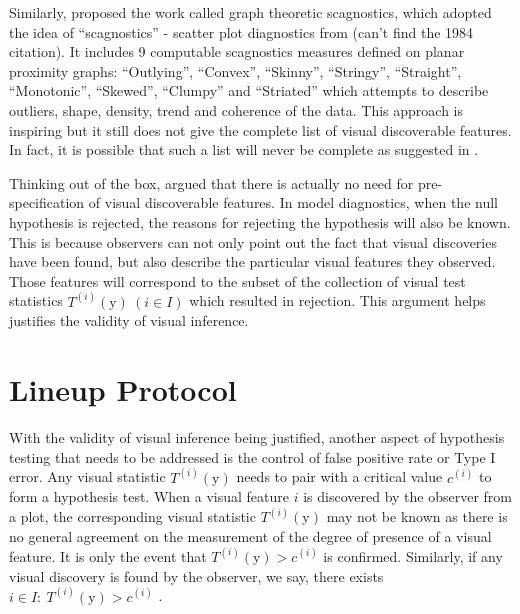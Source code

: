 \documentclass{monashthesis}
\theoremstyle{definition}
\theoremstyle{definition}
\theoremstyle{definition}
\theoremstyle{definition}
\theoremstyle{remark}
\begin{document}
Similarly, \textcite{wilkinson_graph-theoretic_2005} proposed the work called graph theoretic scagnostics, which adopted the idea of ``scagnostics'' - scatter plot diagnostics from (can't find the 1984 citation). It includes 9 computable scagnostics measures defined on planar proximity graphs: ``Outlying'', ``Convex'', ``Skinny'', ``Stringy'', ``Straight'', ``Monotonic'', ``Skewed'', ``Clumpy'' and ``Striated'' which attempts to describe outliers, shape, density, trend and coherence of the data. This approach is inspiring but it still does not give the complete list of visual discoverable features. In fact, it is possible that such a list will never be complete as suggested in \textcite{buja_statistical_2009}.

Thinking out of the box, \textcite{buja_statistical_2009} argued that there is actually no need for pre-specification of visual discoverable features. In model diagnostics, when the null hypothesis is rejected, the reasons for rejecting the hypothesis will also be known. This is because observers can not only point out the fact that visual discoveries have been found, but also describe the particular visual features they observed. Those features will correspond to the subset of the collection of visual test statistics \(T^{(i)}(\boldsymbol{\mathrm{y}})~(i \in I)\) which resulted in rejection. This argument helps justifies the validity of visual inference.

\hypertarget{lineup-protocol}{%
\section{Lineup Protocol}\label{lineup-protocol}}

With the validity of visual inference being justified, another aspect of hypothesis testing that needs to be addressed is the control of false positive rate or Type I error. Any visual statistic \(T^{(i)}(\boldsymbol{\mathrm{y}})\) needs to pair with a critical value \(c^{(i)}\) to form a hypothesis test. When a visual feature \(i\) is discovered by the observer from a plot, the corresponding visual statistic \(T^{(i)}(\boldsymbol{\mathrm{y}})\) may not be known as there is no general agreement on the measurement of the degree of presence of a visual feature. It is only the event that \(T^{(i)}(\boldsymbol{\mathrm{y}}) > c^{(i)}\) is confirmed. Similarly, if any visual discovery is found by the observer, we say, there exists \(i \in I:~T^{(i)}(\boldsymbol{\mathrm{y}}) > c^{(i)}\) \autocite{buja_statistical_2009}.
\end{document}
